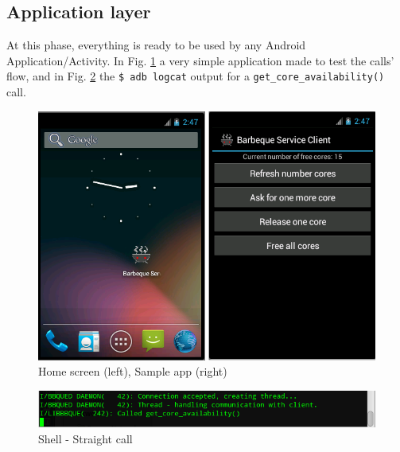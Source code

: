 \subsection{Application layer}
At this phase, everything is ready to be used by any Android Application/Activity. In Fig. \ref{fig:screenshot} a very simple application made to test the calls' flow, and in Fig. \ref{fig:shell} the \texttt{\$ adb logcat} output for a \texttt{get\_core\_availability()} call.
\begin{figure}[!htb]
	\centering
	\includegraphics[scale=.505]{images/screenshot_duo.png}
	\caption{Home screen (left), Sample app (right)}
	\label{fig:screenshot}
\end{figure}
\begin{figure}[!htb]
	\centering
	\includegraphics[scale=.505]{images/shell.png}
	\caption{Shell - Straight call}
	\label{fig:shell}
\end{figure}
